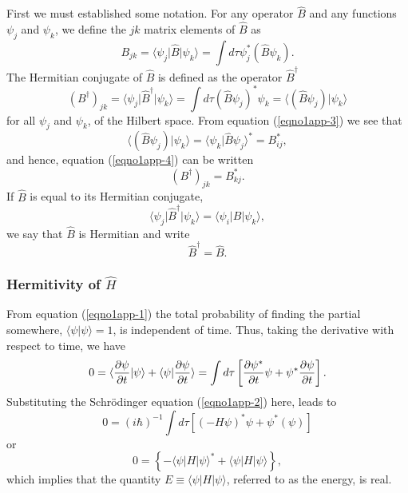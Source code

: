 First we must established some notation. For any operator ${\hat B}$ and any
functions $\psi_j$ and $\psi_k$, we define the $jk$ matrix elements 
of ${\hat B}$ as
\begin{equation}
B_{jk} = \langle \psi_j \vert {\hat B} \vert \psi_k\rangle 
       = \int d \tau \psi_j ^* \left( {\hat B} \psi_k \right).
\label{eqno1app-3}
\end{equation}
The Hermitian conjugate of ${\hat B}$ is defined as the operator
${\hat B}^{\dag}$
\begin{equation}
\left( B^{\dag} \right)_{jk} = \langle \psi_j \vert {\hat B}^{\dag} \vert 
\psi_k \rangle = \int d \tau \left( {\hat B} \psi_j \right) ^* \psi_k = \langle 
\left( {\hat B} \psi_j \right) \vert \psi_k \rangle
\label{eqno1app-4}
\end{equation}
for all $\psi_j$ and $\psi_k$, of the Hilbert space. From equation
(\ref{eqno1app-3}) we see that
\begin{equation}
\langle \left( {\hat B} \psi_j \right) \vert \psi_k \rangle = \langle \psi_k \vert 
{\hat B} \psi_j \rangle ^* = B ^*_{ij},
\end{equation}
and hence, equation (\ref{eqno1app-4}) can be written
\begin{equation}
\left( B^{\dag} \right)_{jk} = B ^*_{kj}.
\end{equation}
If ${\hat B}$ is equal to its Hermitian conjugate,
\begin{equation}
\langle \psi_j \vert {\hat B}^{\dag} \vert \psi_k \rangle = \langle \psi_i \vert B 
\vert \psi_k \rangle ,
\end{equation}
we say that ${\hat B}$ is Hermitian and write
\begin{equation}
{\hat B}^{\dag} = {\hat B} .
\end{equation}

\subsubsection{Hermitivity of $\hat{H}$}
    
From equation (\ref{eqno1app-1}) the total probability of finding the
partial somewhere, $\langle \psi \vert \psi\rangle = 1$, is independent of
time. Thus, taking the derivative with respect to time, we have
\begin{equation}
0 = \langle {\partial \psi \over \partial t} \vert \psi \rangle + \langle 
\psi \vert {\partial \psi \over \partial t} \rangle = \int d \tau 
\left[ {\partial \psi ^* \over \partial t} \psi + \psi ^* {\partial 
\psi \over \partial t} \right] .
\end{equation}
Substituting the Schr\"odinger equation (\ref{eqno1app-2}) here, leads to
\begin{equation}
0 = \left( i \hbar \right)^{-1} \int d \tau \left[ \left( - H \psi \right) ^* 
\psi + \psi ^* ( \psi ) \right]
\end{equation}
or
\begin{equation}
0 = \left\{ - \langle \psi \vert H \vert \psi \rangle ^* + \langle
\psi \vert H \vert \psi \rangle \right\} ,
\end{equation}
which implies that the quantity $E \equiv \langle \psi \vert H \vert 
\psi \rangle$, referred to as the energy, is real.
    
